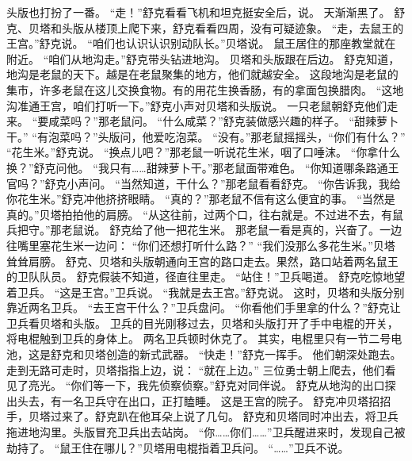 \documentclass[a4paper,12pt,UTF8,twoside]{ctexbook}
\begin{document}
        头版也打扮了一番。 
        “走！”舒克看看飞机和坦克挺安全后，说。 
        天渐渐黑了。 
        舒克、贝塔和头版从楼顶上爬下来，舒克看看四周，没有可疑迹象。 
        “走，去鼠王的王宫。”舒克说。 
        “咱们也认识认识别动队长。”贝塔说。 
        鼠王居住的那座教堂就在附近。 
        “咱们从地沟走。”舒克带头钻进地沟。 
        贝塔和头版跟在后边。 
        舒克知道，地沟是老鼠的天下。越是在老鼠聚集的地方，他们就越安全。 
        这段地沟是老鼠的集市，许多老鼠在这儿交换食物。有的用花生换香肠，有的拿面包换腊肉。 
        “这地沟准通王宫，咱们打听一下。”舒克小声对贝塔和头版说。 
        一只老鼠朝舒克他们走来。 
        “要咸菜吗？”那老鼠问。 
        “什么咸菜？”舒克装做感兴趣的样子。 
        “甜辣萝卜干。” 
        “有泡菜吗？”头版问，他爱吃泡菜。 
        “没有。”那老鼠摇摇头，“你们有什么？” 
        “花生米。”舒克说。 
        “换点儿吧？”那老鼠一听说花生米，咽了口唾沫。 
        “你拿什么换？”舒克问他。 
        “我只有……甜辣萝卜干。”那老鼠面带难色。 
        “你知道哪条路通王官吗？”舒克小声问。 
        “当然知道，干什么？”那老鼠看看舒克。 
        “你告诉我，我给你花生米。”舒克冲他挤挤眼睛。 
        “真的？”那老鼠不信有这么便宜的事。 
        “当然是真的。”贝塔拍拍他的肩膀。 
        “从这往前，过两个口，往右就是。不过进不去，有鼠兵把守。”那老鼠说。 
        舒克给了他一把花生米。 
        那老鼠一看是真的，兴奋了。一边往嘴里塞花生米一边问： 
        “你们还想打听什么路？” 
        “我们没那么多花生米。”贝塔耸耸肩膀。 
        舒克、贝塔和头版朝通向王宫的路口走去。果然，路口站着两名鼠王的卫队队员。 
        舒克假装不知道，径直往里走。 
        “站住！”卫兵喝道。 
        舒克吃惊地望着卫兵。 
        “这是王宫。”卫兵说。 
        “我就是去王宫。”舒克说。 
        这时，贝塔和头版分别靠近两名卫兵。 
        “去王宫干什么？”卫兵盘问。 
        “你看他们手里拿的什么？”舒克让卫兵看贝塔和头版。 
        卫兵的目光刚移过去，贝塔和头版打开了手中电棍的开关，将电棍触到卫兵的身体上。 
        两名卫兵顿时休克了。 
        其实，电棍里只有一节二号电池，这是舒克和贝塔创造的新式武器。 
        “快走！”舒克一挥手。 
        他们朝深处跑去。 
        走到无路可走时，贝塔指指上边，说： 
        “就在上边。” 
        三位勇士朝上爬去，他们看见了亮光。 
        “你们等一下，我先侦察侦察。”舒克对同伴说。 
        舒克从地沟的出口探出头去，有一名卫兵守在出口，正打瞌睡。 
        这是王宫的院子。 
        舒克冲贝塔招招手，贝塔过来了。舒克趴在他耳朵上说了几句。 
        舒克和贝塔同时冲出去，将卫兵拖进地沟里。头版冒充卫兵出去站岗。 
        “你……你们……”卫兵醒进来时，发现自己被劫持了。 
        “鼠王住在哪儿？”贝塔用电棍指着卫兵问。 
        “……”卫兵不说。 
\end{document}
